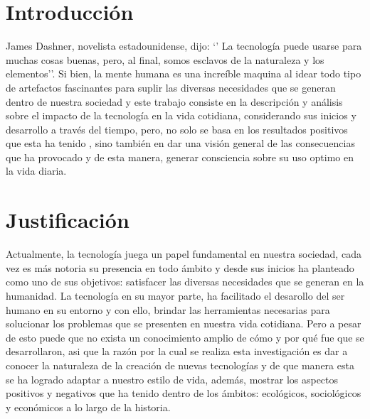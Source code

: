 \documentclass{bmcart}
\begin{document}


\section*{Introducción} 
James Dashner, novelista estadounidense, dijo: ‘’ La tecnología puede usarse para muchas cosas buenas, pero, al final, somos esclavos de la naturaleza y los elementos’’. Si bien, la mente humana es una increíble maquina al idear todo tipo de artefactos fascinantes para suplir  las diversas necesidades que se generan dentro de nuestra sociedad y  este trabajo  consiste en la descripción y análisis sobre el impacto de la tecnología en la vida cotidiana, considerando sus inicios y  desarrollo a través del tiempo, pero, no solo se basa en los resultados positivos que esta ha tenido , sino también en dar una visión general de las consecuencias que ha provocado y  de esta manera, generar consciencia  sobre su uso optimo en la vida diaria.

 \section*{Justificación} 
 Actualmente,  la tecnología juega un papel fundamental en nuestra sociedad, cada vez es más notoria su presencia en todo ámbito y desde sus inicios ha planteado como uno de sus objetivos: satisfacer las diversas necesidades que se generan en la humanidad.  La  tecnolog\'ia en su mayor parte, ha facilitado el desarollo del ser humano en su entorno y con ello, brindar las herramientas necesarias para solucionar los  problemas que se presenten en nuestra vida cotidiana. Pero a pesar de esto puede que no exista un conocimiento amplio de cómo y por qué fue que se desarrollaron, asi que la razón por la cual se realiza esta investigación es dar a conocer la naturaleza de la creación de nuevas tecnologías y de que manera esta se ha logrado adaptar a nuestro estilo de vida, además, mostrar los aspectos positivos y negativos que ha tenido dentro de los ámbitos: ecológicos, sociológicos y económicos a lo largo de la historia.
\end{document}
